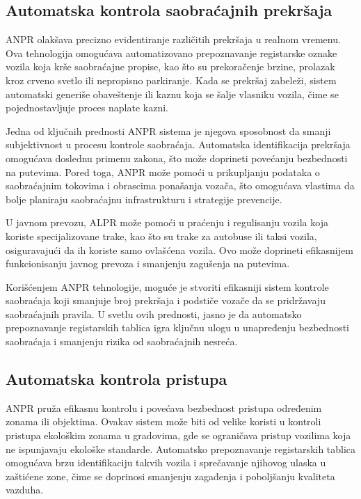 \documentclass[a4paper,12pt]{article}
\begin{document}
	\subsection{Automatska kontrola saobraćajnih prekršaja}
	ANPR olakšava precizno evidentiranje različitih prekršaja u realnom vremenu. Ova tehnologija omogućava automatizovano prepoznavanje registarske oznake vozila koja krše saobraćajne propise, kao što su prekoračenje brzine, prolazak kroz crveno svetlo ili nepropisno parkiranje. Kada se prekršaj zabeleži, sistem automatski generiše obaveštenje ili kaznu koja se šalje vlasniku vozila, čime se pojednostavljuje proces naplate kazni.
	
	Jedna od ključnih prednosti ANPR sistema je njegova sposobnost da smanji subjektivnost u procesu kontrole saobraćaja. Automatska identifikacija prekršaja omogućava doslednu primenu zakona, što može doprineti povećanju bezbednosti na putevima. Pored toga, ANPR može pomoći u prikupljanju podataka o saobraćajnim tokovima i obrascima ponašanja vozača, što omogućava vlastima da bolje planiraju saobraćajnu infrastrukturu i strategije prevencije.
	
	U javnom prevozu, ALPR može pomoći u praćenju i regulisanju vozila koja koriste specijalizovane trake, kao što su trake za autobuse ili taksi vozila, osiguravajući da ih koriste samo ovlašćena vozila. Ovo može doprineti efikasnijem funkcionisanju javnog prevoza i smanjenju zagušenja na putevima.
	
	Korišćenjem ANPR tehnologije, moguće je stvoriti efikasniji sistem kontrole saobraćaja koji smanjuje broj prekršaja i podstiče vozače da se pridržavaju saobraćajnih pravila. U svetlu ovih prednosti, jasno je da automatsko prepoznavanje registarskih tablica igra ključnu ulogu u unapređenju bezbednosti saobraćaja i smanjenju rizika od saobraćajnih nesreća.
	
	\subsection{Automatska kontrola pristupa}
	ANPR pruža efikasnu kontrolu i povećava bezbednost pristupa određenim zonama ili objektima. Ovakav sistem može biti od velike koristi u kontroli pristupa ekološkim zonama u gradovima, gde se ograničava pristup vozilima koja ne ispunjavaju ekološke standarde. Automatsko prepoznavanje registarskih tablica omogućava brzu identifikaciju takvih vozila i sprečavanje njihovog ulaska u zaštićene zone, čime se doprinosi smanjenju zagađenja i poboljšanju kvaliteta vazduha.
	
\end{document}
